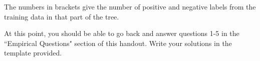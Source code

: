 \documentclass[11pt,addpoints,answers]{exam}
\begin{document}
The numbers in brackets give the number of positive and negative labels from the training data in that part of the tree.

\begin{notebox}
At this point, you should be able to go back and answer questions 1-5 in the ``Empirical Questions" section of this handout.  Write your solutions in the template provided. \end{notebox}

\begin{comment}
    \subsection{Evaluation}
    In addition to the politician and education datasets, our autograder will test your code on two more datasets, which will not be shown to you. One set contains information about various cars, and whether or not consumers decided to buy them. The other contains data about songs, and whether or not they became top hits. The data will be in .tsv files formatted like the ones provided, again with the class as the last column. Shown below are the attributes and the values they can take: 
    
    Music data:
    
    \begin{itemize}
    \item \texttt{Attribute:year('before1950'or'after1950')}
    \item \texttt{Attribute:solo('yes'or'no')}
    \item \texttt{Attribute:vocal('yes'or'no')}
    \item \texttt{Attribute:length('morethan3min'or'lessthan3min')}
    \item \texttt{Attribute:original('yes'or'no')}
    \item \texttt{Attribute:tempo('fast'or'slow')}
    \item \texttt{Attribute:folk('yes'or'no')}
    \item \texttt{Attribute:classical('yes'or'no')}
    \item \texttt{Attribute:rhythm('yes'or'no')}
    \item \texttt{Attribute:jazz('yes'or'no')}
    \item \texttt{Attribute:rock('yes'or'no')}
    \item \texttt{Class Label:hit('yes'or'no')}
    \end{itemize}
    
    Cars data:
    

\end{comment}
\end{document}
